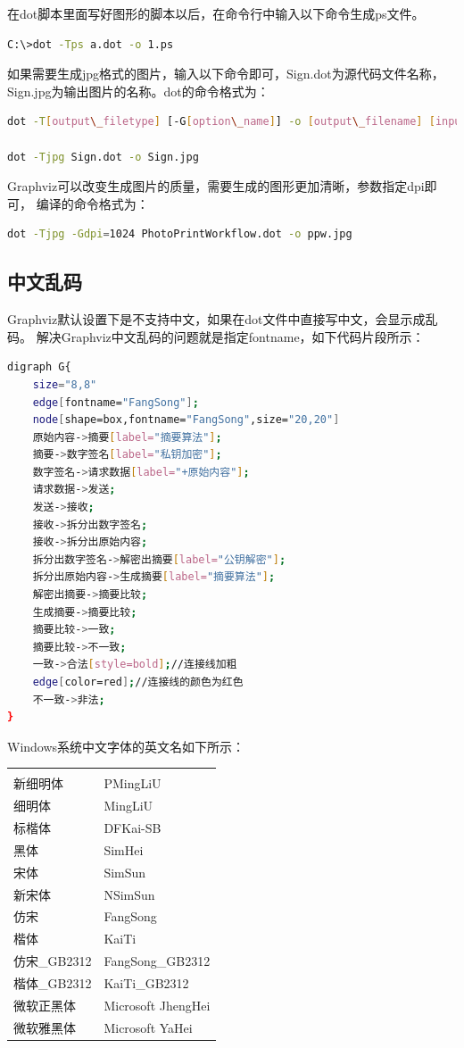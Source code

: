 \documentclass{book}
\begin{document}
在dot脚本里面写好图形的脚本以后，在命令行中输入以下命令生成ps文件。

\begin{lstlisting}[language=Bash]
C:\>dot -Tps a.dot -o 1.ps
\end{lstlisting}

如果需要生成jpg格式的图片，输入以下命令即可，Sign.dot为源代码文件名称，Sign.jpg为输出图片的名称。dot的命令格式为：

\begin{lstlisting}[language=Bash]
dot -T[output\_filetype] [-G[option\_name]] -o [output\_filename] [input\_filename] 

dot -Tjpg Sign.dot -o Sign.jpg
\end{lstlisting}

Graphviz可以改变生成图片的质量，需要生成的图形更加清晰，参数指定dpi即可，
编译的命令格式为：

\begin{lstlisting}[language=Bash]
dot -Tjpg -Gdpi=1024 PhotoPrintWorkflow.dot -o ppw.jpg
\end{lstlisting}

\subsection{中文乱码}

Graphviz默认设置下是不支持中文，如果在dot文件中直接写中文，会显示成乱码。
解决Graphviz中文乱码的问题就是指定fontname，如下代码片段所示：

\begin{lstlisting}[language=Bash]
digraph G{
	size="8,8"
	edge[fontname="FangSong"];
	node[shape=box,fontname="FangSong",size="20,20"]	
	原始内容->摘要[label="摘要算法"];
	摘要->数字签名[label="私钥加密"];
	数字签名->请求数据[label="+原始内容"];
	请求数据->发送;	
	发送->接收;
	接收->拆分出数字签名;
	接收->拆分出原始内容;
	拆分出数字签名->解密出摘要[label="公钥解密"];
	拆分出原始内容->生成摘要[label="摘要算法"];
	解密出摘要->摘要比较;
	生成摘要->摘要比较;
	摘要比较->一致;
	摘要比较->不一致;
	一致->合法[style=bold];//连接线加粗
	edge[color=red];//连接线的颜色为红色
	不一致->非法;	
}
\end{lstlisting}

Windows系统中文字体的英文名如下所示：

\begin{tabular}{ll}
	\multirow{1}{*}{}			
	& \multicolumn{1}{c}{}\\
	新细明体 & PMingLiU\\
	细明体 & MingLiU\\	
	标楷体 & DFKai-SB\\
	黑体 & SimHei\\
	宋体 & SimSun\\
	新宋体 & NSimSun\\
	仿宋 & FangSong\\
	楷体 & KaiTi\\
	仿宋\_GB2312 & FangSong\_GB2312\\	
	楷体\_GB2312 & KaiTi\_GB2312\\
	微软正黑体 & Microsoft JhengHei\\
	微软雅黑体 & Microsoft YaHei\\				
\end{tabular}
\end{document}
